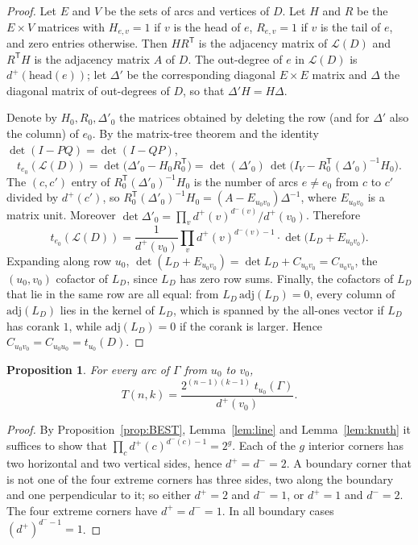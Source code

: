 \documentclass[11pt,a4paper]{amsart}
\newtheorem{proposition}[theorem]{Proposition}
\theoremstyle{remark}
\newcommand{\G}{\Gamma}
\newcommand{\dout}{d^{+}}
\newcommand{\din}{d^{-}}
\begin{document}
\begin{proof}
Let $E$ and $V$ be the sets of arcs and vertices of $D$. Let $H$ and $R$ be the $E\times V$ matrices with
$H_{e,v}=1$ if $v$ is the head of $e$, $R_{e,v}=1$ if $v$ is the tail of $e$, and zero entries otherwise. Then
$HR^{\mathsf T}$ is the adjacency matrix of $\mathcal L(D)$ and $R^{\mathsf T}H$ is the adjacency matrix $A$ of
$D$. The out-degree of $e$ in $\mathcal L(D)$ is $\dout(\mathrm{head}(e))$; let $\Delta'$ be the corresponding
diagonal $E\times E$ matrix and $\Delta$ the diagonal matrix of out-degrees of $D$, so that $\Delta'H=H\Delta$.

Denote by $H_0,R_0,\Delta'_0$ the matrices obtained by deleting the row (and for $\Delta'$ also the column) of
$e_0$. By the matrix-tree theorem and the identity $\det(I-PQ)=\det(I-QP)$,
\[
t_{e_0}(\mathcal L(D))=\det\bigl(\Delta'_0-H_0R_0^{\mathsf T}\bigr)
=\det(\Delta'_0)\,\det\bigl(I_V-R_0^{\mathsf T}(\Delta'_0)^{-1}H_0\bigr).
\]
The $(c,c')$ entry of $R_0^{\mathsf T}(\Delta'_0)^{-1}H_0$ is the number of arcs $e\neq e_0$ from $c$ to $c'$ divided
by $\dout(c')$, so $R_0^{\mathsf T}(\Delta'_0)^{-1}H_0=(A-E_{u_0v_0})\Delta^{-1}$, where $E_{u_0v_0}$ is a matrix
unit. Moreover $\det\Delta'_0=\prod_{v}\dout(v)^{\din(v)}/\dout(v_0)$. Therefore
\[
t_{e_0}(\mathcal L(D))=\frac{1}{\dout(v_0)}\prod_v\dout(v)^{\din(v)-1}\cdot\det\bigl(L_D+E_{u_0v_0}\bigr).
\]
Expanding along row $u_0$, $\det(L_D+E_{u_0v_0})=\det L_D+C_{u_0v_0}=C_{u_0v_0}$, the $(u_0,v_0)$ cofactor of
$L_D$, since $L_D$ has zero row sums. Finally, the cofactors of $L_D$ that lie in the same row are all equal: from $L_D\,\mathrm{adj}(L_D)=0$, every
column of $\mathrm{adj}(L_D)$ lies in the kernel of $L_D$, which is spanned by the all-ones vector if $L_D$ has
corank $1$, while $\mathrm{adj}(L_D)=0$ if the corank is larger. Hence $C_{u_0v_0}=C_{u_0u_0}=t_{u_0}(D)$.
\end{proof}

\begin{proposition}\label{prop:gamma}
For every arc of $\G$ from $u_0$ to $v_0$,
\[ T(n,k)=\frac{2^{(n-1)(k-1)}\;t_{u_0}(\G)}{\dout(v_0)}. \]
\end{proposition}

\begin{proof}
By Proposition~\ref{prop:BEST}, Lemma~\ref{lem:line} and Lemma~\ref{lem:knuth} it suffices to show that
$\prod_c\dout(c)^{\din(c)-1}=2^{g}$. Each of the $g$ interior corners has two horizontal and two vertical sides,
hence $\dout=\din=2$. A boundary corner that is not one of the four extreme corners has three sides, two along the
boundary and one perpendicular to it; so either $\dout=2$ and $\din=1$, or $\dout=1$ and $\din=2$. The four
extreme corners have $\dout=\din=1$. In all boundary cases $(\dout)^{\din-1}=1$.
\end{proof}
\end{document}
